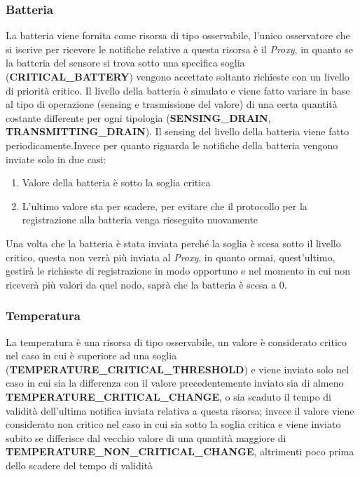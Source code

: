       \subsubsection{Batteria}
        La batteria viene fornita come risorsa di tipo osservabile, l'unico osservatore che si iscrive per ricevere le notifiche relative a questa risorsa è il \textit{Proxy},
        in quanto se la batteria del sensore si trova sotto una specifica soglia (\textbf{CRITICAL\_BATTERY}) vengono accettate
        soltanto richieste con un livello di priorità critico.\newline
        Il livello della batteria è simulato e viene fatto variare in base al tipo di operazione (sensing e trasmissione del valore)
        di una certa quantità costante differente per ogni tipologia (\textbf{SENSING\_DRAIN}, \textbf{TRANSMITTING\_DRAIN}).\newline
        Il sensing del livello della batteria viene fatto periodicamente.Invece per quanto riguarda le notifiche della batteria vengono inviate solo in due casi:
        \begin{enumerate}
          \item Valore della batteria è sotto la soglia critica
          \item L'ultimo valore sta per scadere, per evitare che il protocollo per la registrazione alla batteria venga rieseguito nuovamente
        \end{enumerate}

        Una volta che la batteria è stata inviata perché la soglia è scesa sotto il livello critico, questa non verrà più inviata al \textit{Proxy}, in quanto ormai, quest'ultimo,
        gestirà le richieste di registrazione in modo opportuno e nel momento in cui non riceverà più valori da quel nodo, saprà che la batteria è scesa a 0.

        


      \subsubsection{Temperatura}
        La temperatura è una risorsa di tipo osservabile, un valore è considerato critico nel caso in cui è superiore ad una soglia (\textbf{TEMPERATURE\_CRITICAL\_THRESHOLD})
        e viene inviato solo nel caso in cui sia la differenza con il valore precedentemente inviato sia di almeno \textbf{TEMPERATURE\_CRITICAL\_CHANGE},
        o sia scaduto il tempo di validità dell'ultima notifica inviata relativa a questa risorsa; invece il valore viene considerato non critico nel caso in cui sia sotto la
        soglia critica e viene inviato subito se differisce dal vecchio valore di una quantità maggiore di \textbf{TEMPERATURE\_NON\_CRITICAL\_CHANGE}, altrimenti poco prima
        dello scadere del tempo di validità

